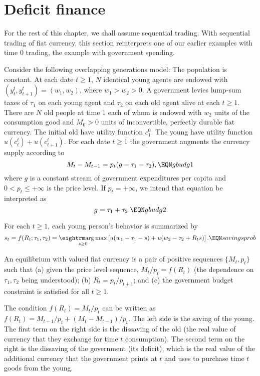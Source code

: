 \section{Deficit finance}
For the rest of this chapter, we shall assume sequential trading.
With sequential trading of fiat currency,
this section reinterprets one of our earlier examples with time $0$ trading, the example with government spending.

Consider the following overlapping generations model:
The population is constant.
At each date $t \geq 1$, $N$ identical young agents are endowed
with $(y_t^t, y^t_{t+1}) = (w_1, w_2) $, where $w_1 > w_2 >0$.
A government   levies lump-sum taxes of
$\tau_1$ on each young agent and $\tau_2$ on each old agent
  alive at each $t \geq 1$.    There are $N$   old people at
time $1$ each of whom is endowed with $w_2$ units of the
consumption good and $M_0>0$ units of inconvertible, perfectly durable
fiat currency. The initial old have utility function
$c^0_1$.   The young have utility function
$u(c^t_t) + u(c^t_{t+1})$.
 For each date $t \geq 1$ the government
augments the currency supply according to
$$ M_t - M_{t-1} = p_t ( g - \tau_1 -   \tau_2), \EQN gbudg1 $$
where $g$ is a constant stream of government expenditures per capita
and $0 < p_t \leq + \infty$ is the price level.
If $p_t = +\infty$, we intend  that    equation
 be interpreted as
$$ g = \tau_1 + \tau_2.  \EQN gbudg2 $$


   For each $t \geq 1$, each young person's behavior
is summarized by
$$  s_t = f(R_t;\tau_1, \tau_2) = \argmax_{s\geq 0} \left[ u(w_1 - \tau_1
     -s)+u(w_2-\tau_2 + R_t s)\right] .\EQN savingsprob $$


\medskip
{} An equilibrium with valued fiat currency is a pair  of
positive sequences $\{M_t, p_t\}$  such that (a) given the price level
sequence, $M_t/p_t =  f(R_t)$ (the dependence on $\tau_1,\tau_2$ being
understood); (b) $R_t = p_t / p_{t+1}$; and (c) the government budget
constraint  is satisfied for all $t\geq 1$.
\medskip

The condition $f(R_t) = M_t/p_t$  can be written
as $f(R_t) = M_{t-1} /p_t + (M_t - M_{t-1})/p_t$.  The left side
is the saving of the young.  The first term on  the right side is the
dissaving of the old (the real value of currency  that they
exchange for time $t$ consumption). The second term on the right
is the dissaving of the government (its deficit), which is
the real value of the additional currency that the government
prints at $t$ and uses to purchase time $t$ goods from the young.

